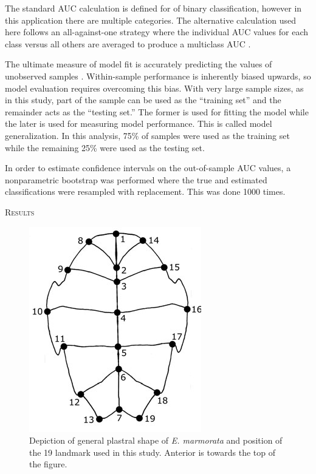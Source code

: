 \documentclass[12pt,letterpaper]{article}
\renewcommand{\section}[1]{%
\bigskip
\begin{center}
\begin{Large}
\normalfont\scshape #1
\medskip
\end{Large}
\end{center}}
\begin{document}
The standard AUC calculation is defined for of binary classification, however in this application there are multiple categories. The alternative calculation used here follows an all-against-one strategy where the individual AUC values for each class versus all others are averaged to produce a multiclass AUC \citep{Hand2001}.

The ultimate measure of model fit is accurately predicting the values of unobserved samples \citep{Hastie2009,Kuhn2013}. Within-sample performance is inherently biased upwards, so model evaluation requires overcoming this bias. With very large sample sizes, as in this study, part of the sample can be used as the ``training set'' and the remainder acts as the ``testing set.'' The former is used for fitting the model while the later is used for measuring model performance. This is called model generalization. In this analysis, 75\% of samples were used as the training set while the remaining 25\% were used as the testing set.

In order to estimate confidence intervals on the out-of-sample AUC values, a nonparametric bootstrap was performed where the true and estimated classifications were resampled with replacement. This was done 1000 times.



\section{Results}






\clearpage

\begin{figure}[ht]
  \centering
  \includegraphics{figure/plastra}
  \caption{Depiction of general plastral shape of \textit{E. marmorata} and position of the 19 landmark used in this study. Anterior is towards the top of the figure.}
  \label{fig:plastra}
\end{figure}
\end{document}
